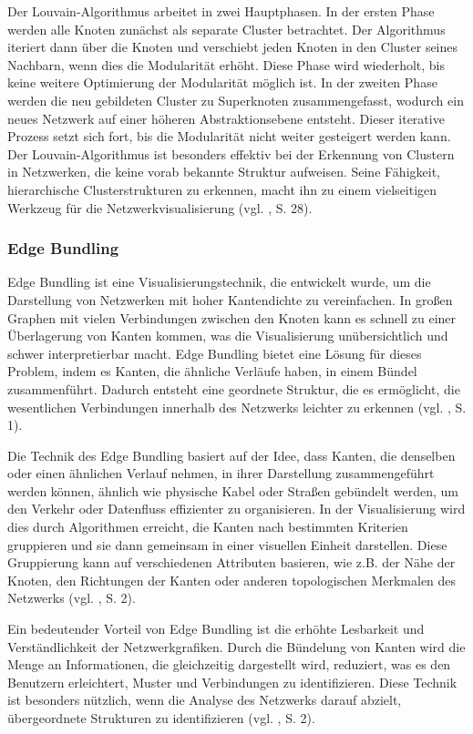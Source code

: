 Der Louvain-Algorithmus arbeitet in zwei Hauptphasen. In der ersten Phase werden alle Knoten zunächst als separate Cluster betrachtet. Der Algorithmus iteriert dann über die Knoten und verschiebt jeden Knoten in den Cluster seines Nachbarn, wenn dies die Modularität erhöht. Diese Phase wird wiederholt, bis keine weitere Optimierung der Modularität möglich ist. In der zweiten Phase werden die neu gebildeten Cluster zu Superknoten zusammengefasst, wodurch ein neues Netzwerk auf einer höheren Abstraktionsebene entsteht. Dieser iterative Prozess setzt sich fort, bis die Modularität nicht weiter gesteigert werden kann. Der Louvain-Algorithmus ist besonders effektiv bei der Erkennung von Clustern in Netzwerken, die keine vorab bekannte Struktur aufweisen. Seine Fähigkeit, hierarchische Clusterstrukturen zu erkennen, macht ihn zu einem vielseitigen Werkzeug für die Netzwerkvisualisierung (vgl. \cite{louvain:Que}, S. 28).

\subsubsection{Edge Bundling}

Edge Bundling ist eine Visualisierungstechnik, die entwickelt wurde, um die Darstellung von Netzwerken mit hoher Kantendichte zu vereinfachen. In großen Graphen mit vielen Verbindungen zwischen den Knoten kann es schnell zu einer Überlagerung von Kanten kommen, was die Visualisierung unübersichtlich und schwer interpretierbar macht. Edge Bundling bietet eine Lösung für dieses Problem, indem es Kanten, die ähnliche Verläufe haben, in einem Bündel zusammenführt. Dadurch entsteht eine geordnete Struktur, die es ermöglicht, die wesentlichen Verbindungen innerhalb des Netzwerks leichter zu erkennen (vgl. \cite{edgeBundling:Holten}, S. 1).

Die Technik des Edge Bundling basiert auf der Idee, dass Kanten, die denselben oder einen ähnlichen Verlauf nehmen, in ihrer Darstellung zusammengeführt werden können, ähnlich wie physische Kabel oder Straßen gebündelt werden, um den Verkehr oder Datenfluss effizienter zu organisieren. In der Visualisierung wird dies durch Algorithmen erreicht, die Kanten nach bestimmten Kriterien gruppieren und sie dann gemeinsam in einer visuellen Einheit darstellen. Diese Gruppierung kann auf verschiedenen Attributen basieren, wie z.B. der Nähe der Knoten, den Richtungen der Kanten oder anderen topologischen Merkmalen des Netzwerks (vgl. \cite{edgeBundling:Holten}, S. 2).

Ein bedeutender Vorteil von Edge Bundling ist die erhöhte Lesbarkeit und Verständlichkeit der Netzwerkgrafiken. Durch die Bündelung von Kanten wird die Menge an Informationen, die gleichzeitig dargestellt wird, reduziert, was es den Benutzern erleichtert, Muster und Verbindungen zu identifizieren. Diese Technik ist besonders nützlich, wenn die Analyse des Netzwerks darauf abzielt, übergeordnete Strukturen  zu identifizieren (vgl. \cite{edgeBundling:Holten}, S. 2).


